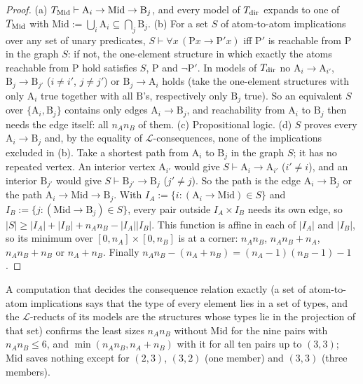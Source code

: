 \begin{proof}
(a) $T_{\rm Mid}\vdash\mathrm A_i\to\mathrm{Mid}\to\mathrm B_j$, and every model of $T_{\rm dir}$ expands to one of $T_{\rm Mid}$ with $\mathrm{Mid}:=\bigcup_i\mathrm A_i\subseteq\bigcap_j\mathrm B_j$. (b) For a set $S$ of atom-to-atom implications over any set of unary predicates, $S\vdash\forall x\,(\mathrm Px\to\mathrm P'x)$ iff $\mathrm P'$ is reachable from $\mathrm P$ in the graph $S$: if not, the one-element structure in which exactly the atoms reachable from $\mathrm P$ hold satisfies $S$, $\mathrm P$ and $\neg\mathrm P'$. In models of $T_{\rm dir}$ no $\mathrm A_i\to\mathrm A_{i'}$, $\mathrm B_j\to\mathrm B_{j'}$ ($i\ne i'$, $j\ne j'$) or $\mathrm B_j\to\mathrm A_i$ holds (take the one-element structures with only $\mathrm A_i$ true together with all $\mathrm B$'s, respectively only $\mathrm B_j$ true). So an equivalent $S$ over $\{\mathrm A_i,\mathrm B_j\}$ contains only edges $\mathrm A_i\to\mathrm B_j$, and reachability from $\mathrm A_i$ to $\mathrm B_j$ then needs the edge itself: all $n_An_B$ of them. (c) Propositional logic. (d) $S$ proves every $\mathrm A_i\to\mathrm B_j$ and, by the equality of $\mathcal L$-consequences, none of the implications excluded in (b). Take a shortest path from $\mathrm A_i$ to $\mathrm B_j$ in the graph $S$; it has no repeated vertex. An interior vertex $\mathrm A_{i'}$ would give $S\vdash\mathrm A_i\to\mathrm A_{i'}$ ($i'\ne i$), and an interior $\mathrm B_{j'}$ would give $S\vdash\mathrm B_{j'}\to\mathrm B_j$ ($j'\ne j$). So the path is the edge $\mathrm A_i\to\mathrm B_j$ or the path $\mathrm A_i\to\mathrm{Mid}\to\mathrm B_j$. With $I_A:=\{i:(\mathrm A_i\to\mathrm{Mid})\in S\}$ and $I_B:=\{j:(\mathrm{Mid}\to\mathrm B_j)\in S\}$, every pair outside $I_A\times I_B$ needs its own edge, so $\lvert S\rvert\ge\lvert I_A\rvert+\lvert I_B\rvert+n_An_B-\lvert I_A\rvert\lvert I_B\rvert$. This function is affine in each of $\lvert I_A\rvert$ and $\lvert I_B\rvert$, so its minimum over $[0,n_A]\times[0,n_B]$ is at a corner: $n_An_B$, $n_An_B+n_A$, $n_An_B+n_B$ or $n_A+n_B$. Finally $n_An_B-(n_A+n_B)=(n_A-1)(n_B-1)-1$.
\end{proof}

A computation that decides the consequence relation exactly (a set of atom-to-atom implications says that the type of every element lies in a set of types, and the $\mathcal L$-reducts of its models are the structures whose types lie in the projection of that set) confirms the least sizes $n_An_B$ without $\mathrm{Mid}$ for the nine pairs with $n_An_B\le6$, and $\min(n_An_B,n_A+n_B)$ with it for all ten pairs up to $(3,3)$; $\mathrm{Mid}$ saves nothing except for $(2,3)$, $(3,2)$ (one member) and $(3,3)$ (three members).
